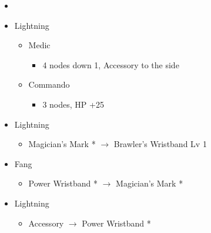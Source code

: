 \begin{menu}
\begin{multicols}{2}
\begin{itemize}
    \paradigm
    \begin{itemize}
        \item {}%
{\paradigmline{\com}{\com}{\rav}}%
{\paradigmline{\rav}{\com}{\rav}}%
{\paradigmline{(\com)}{(\com)}{\rav}}%
{\paradigmline{(\com)}{(\com)}{(\med)}}%
{\paradigmline[5]{\textit{(\com)}}{\textit{(\com)}}{\textit{\syn}}}%
{\paradigmline{(\com)}{\com}{(\med)}}
    \end{itemize}
    \crystarium
    \begin{itemize}
        \item Lightning
        \begin{itemize}
            \item Medic
            \begin{itemize}
                \item 4 nodes down 1, Accessory to the side
            \end{itemize}
            \item Commando
            \begin{itemize}
                \item 3 nodes, HP +25
            \end{itemize}
        \end{itemize}
    \end{itemize}
    \columnbreak
    \equip
    \begin{itemize}
        \item Lightning
        \begin{itemize}
                \item Magician's Mark * $\rightarrow$ Brawler's Wristband Lv 1
        \end{itemize}
        \item Fang
        \begin{itemize}
                \item Power Wristband * $\rightarrow$ Magician's Mark *
        \end{itemize}
        \item Lightning
        \begin{itemize}
                \item Accessory $\rightarrow$ Power Wristband *
        \end{itemize}
    \end{itemize}
\end{itemize}
\end{multicols}
\end{menu}

